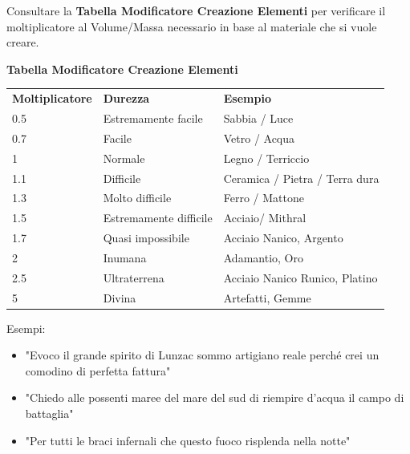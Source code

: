 \documentclass[a4paper,10 pt,twoside,openany]{book}
\begin{document}
\bigskip

Consultare la \textbf{Tabella Modificatore Creazione Elementi} per verificare il moltiplicatore al Volume/Massa necessario in base al materiale che si vuole creare.

\bigskip

\textbf{Tabella Modificatore Creazione Elementi}

\medskip
\begin{tabular}{lll}
	\toprule
	\textbf{Moltiplicatore} & \textbf{Durezza}       & \textbf{Esempio}\\
	0.5                   & Estremamente facile    & Sabbia / Luce \\
	0.7                   & Facile                 & Vetro / Acqua\\
	1                     & Normale                & Legno / Terriccio\\
	1.1                   & Difficile              & Ceramica / Pietra / Terra dura\\
	1.3                   & Molto difficile        & Ferro / Mattone\\
	1.5                   & Estremamente difficile & Acciaio/ Mithral\\
	1.7                   & Quasi impossibile      & Acciaio Nanico, Argento\\
	2                     & Inumana                & Adamantio, Oro\\
	2.5                   & Ultraterrena           & Acciaio Nanico Runico, Platino\\
	5                     & Divina                 & Artefatti, Gemme\\
\end{tabular}


Esempi:
\begin{itemize}
	\item "Evoco il grande spirito di Lunzac sommo artigiano reale perché crei un comodino di perfetta fattura"
	\item "Chiedo alle possenti maree del mare del sud di riempire d'acqua il campo di battaglia"
	\item "Per tutti le braci infernali che questo fuoco risplenda nella notte"
\end{itemize}

\bigskip
\end{document}
